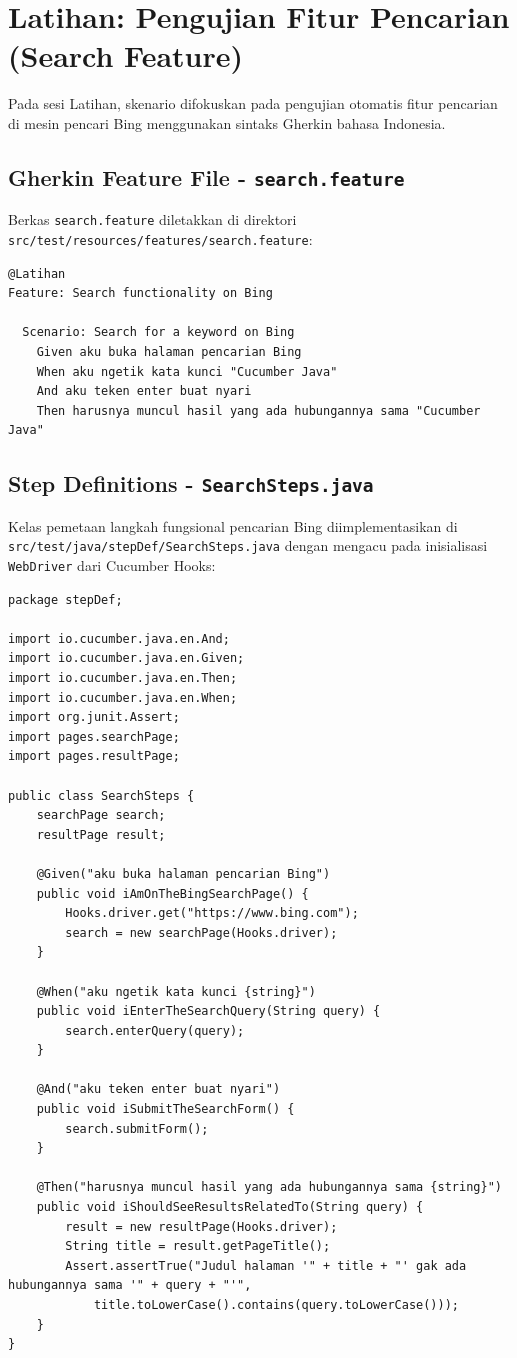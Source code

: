 \documentclass[a4paper,oneside,12pt]{report}
\begin{document}
\section{Latihan: Pengujian Fitur Pencarian (Search Feature)}
Pada sesi Latihan, skenario difokuskan pada pengujian otomatis fitur pencarian di mesin pencari Bing menggunakan sintaks Gherkin bahasa Indonesia.

\subsection{Gherkin Feature File - \texttt{search.feature}}
Berkas \texttt{search.feature} diletakkan di direktori \texttt{src/test/resources/features/search.feature}:
\begin{lstlisting}[style=gherkinstyle, caption={Skenario Uji search.feature dengan Bahasa Gherkin}]
@Latihan
Feature: Search functionality on Bing

  Scenario: Search for a keyword on Bing
    Given aku buka halaman pencarian Bing
    When aku ngetik kata kunci "Cucumber Java"
    And aku teken enter buat nyari
    Then harusnya muncul hasil yang ada hubungannya sama "Cucumber Java"
\end{lstlisting}

\subsection{Step Definitions - \texttt{SearchSteps.java}}
Kelas pemetaan langkah fungsional pencarian Bing diimplementasikan di \texttt{src/test/java/stepDef/SearchSteps.java} dengan mengacu pada inisialisasi \texttt{WebDriver} dari Cucumber Hooks:
\begin{lstlisting}[style=javastyle, caption={Implementasi Kelas Langkah Uji SearchSteps.java}]
package stepDef;

import io.cucumber.java.en.And;
import io.cucumber.java.en.Given;
import io.cucumber.java.en.Then;
import io.cucumber.java.en.When;
import org.junit.Assert;
import pages.searchPage;
import pages.resultPage;

public class SearchSteps {
    searchPage search;
    resultPage result;

    @Given("aku buka halaman pencarian Bing")
    public void iAmOnTheBingSearchPage() {
        Hooks.driver.get("https://www.bing.com");
        search = new searchPage(Hooks.driver);
    }

    @When("aku ngetik kata kunci {string}")
    public void iEnterTheSearchQuery(String query) {
        search.enterQuery(query);
    }

    @And("aku teken enter buat nyari")
    public void iSubmitTheSearchForm() {
        search.submitForm();
    }

    @Then("harusnya muncul hasil yang ada hubungannya sama {string}")
    public void iShouldSeeResultsRelatedTo(String query) {
        result = new resultPage(Hooks.driver);
        String title = result.getPageTitle();
        Assert.assertTrue("Judul halaman '" + title + "' gak ada hubungannya sama '" + query + "'", 
            title.toLowerCase().contains(query.toLowerCase()));
    }
}
\end{lstlisting}
\end{document}
